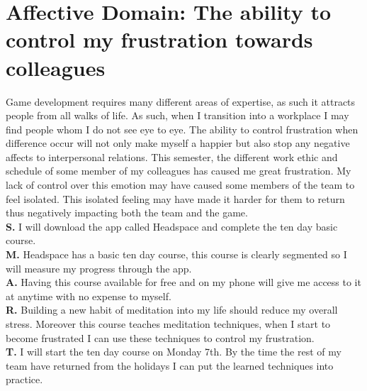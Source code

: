 \documentclass{scrartcl}
\begin{document}
\section{Affective Domain: The ability to control my frustration towards colleagues}
Game development requires many different areas of expertise, as such it attracts people from all walks of life. As such, when I transition into a workplace I may find people whom I do not see eye to eye. The ability to control frustration when difference occur will not only make myself a happier but also stop any negative affects to interpersonal relations. This semester, the different work ethic and schedule of some member of my colleagues has caused me great frustration. My lack of control over this emotion may have caused some members of the team to feel isolated. This isolated feeling may have made it harder for them to return thus negatively impacting both the team and the game. \\
\textbf{S.}    I will download the app called Headspace and complete the ten day basic course.\\
\textbf{M.}   Headspace has a basic ten day course, this course is clearly segmented so I will measure my progress through the app.\\
\textbf{A.}   Having this course available for free and on my phone will give me access to it at anytime with no expense to myself. \\
\textbf{R.}  Building a new habit of meditation into my life should reduce my overall stress. Moreover this course teaches meditation techniques, when I start to become frustrated I can use these techniques to control my frustration.\\
\textbf{T.}  I will start the ten day course on Monday 7th. By the time the rest of my team have returned from the holidays I can put the learned techniques into practice.\\
\end{document}

